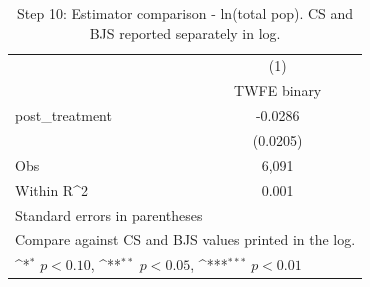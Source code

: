 \begin{table}[htbp]\centering
\def\sym#1{\ifmmode^{#1}\else\(^{#1}\)\fi}
\caption{Step 10: Estimator comparison - ln(total pop). CS and BJS reported separately in log.}
\begin{tabular}{l*{1}{c}}
\hline\hline
            &\multicolumn{1}{c}{(1)}\\
            &\multicolumn{1}{c}{TWFE binary}\\
\hline
post\_treatment&     -0.0286         \\
            &    (0.0205)         \\
\hline
Obs         &       6,091         \\
Within R^2  &       0.001         \\
\hline\hline
\multicolumn{2}{l}{\footnotesize Standard errors in parentheses}\\
\multicolumn{2}{l}{\footnotesize Compare against CS and BJS values printed in the log.}\\
\multicolumn{2}{l}{\footnotesize \sym{*} \(p<0.10\), \sym{**} \(p<0.05\), \sym{***} \(p<0.01\)}\\
\end{tabular}
\end{table}
